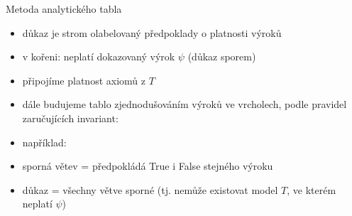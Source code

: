 \documentclass{beamer}
\begin{document}
\begin{frame}{Metoda analytického tabla}

\begin{itemize}
    \item důkaz je strom olabelovaný předpoklady o platnosti výroků
    \item v kořeni: \alert{neplatí} dokazovaný výrok $\psi$ (důkaz sporem)
    \item připojíme platnost axiomů z $T$
    \item dále budujeme tablo zjednodušováním výroků ve vrcholech, podle pravidel zaručujících invariant:\smallskip
    
    \item například:
    \item \alert{sporná} větev = předpokládá True i False stejného výroku
    \item \alert{důkaz} = všechny větve sporné (tj. nemůže existovat model $T$, ve kterém neplatí $\psi$)
\end{itemize}

\end{frame}
\end{document}
